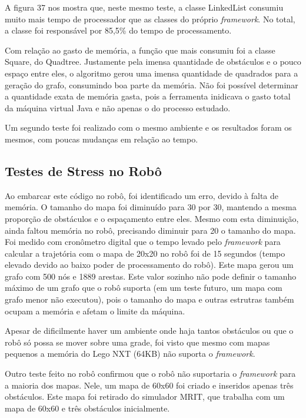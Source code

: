 A figura 37 nos mostra que, neste mesmo teste, a classe LinkedList consumiu muito mais tempo de processador que as classes do próprio \textit{framework}. No total, a classe foi responsável por 85,5\% do tempo de processamento.

Com relação ao gasto de memória, a função que mais consumiu foi a classe Square, do Quadtree. Justamente pela imensa quantidade de obstáculos e o pouco espaço entre eles, o algoritmo gerou uma imensa quantidade de quadrados para a geração do grafo, consumindo boa parte da memória. Não foi possível determinar a quantidade exata de memória gasta, pois a ferramenta inidicava o gasto total da máquina virtual Java e não apenas o do processo estudado.

Um segundo teste foi realizado com o mesmo ambiente e os resultados foram os mesmos, com poucas mudanças em relação ao tempo.

\subsection{Testes de Stress no Robô}

Ao embarcar este código no robô, foi identificado um erro, devido à falta de memória. O tamanho do mapa foi diminuído para 30 por 30, mantendo a mesma proporção de obstáculos e o espaçamento entre eles. Mesmo com esta diminuição, ainda faltou memória no robô, precisando diminuir para 20 o tamanho do mapa. Foi medido com cronômetro digital que o tempo levado pelo \textit{framework} para calcular a trajetória com o mapa de 20x20 no robô foi de 15 segundos (tempo elevado devido ao baixo poder de processamento do robô). Este mapa gerou um grafo com 500 nós e 1889 arestas. Este valor sozinho não pode definir o tamanho máximo de um grafo que o robô suporta (em um teste futuro, um mapa com grafo menor não executou), pois o tamanho do mapa e outras estrutras também ocupam a memória e afetam o limite da máquina.

Apesar de dificilmente haver um ambiente onde haja tantos obstáculos ou que o robô só possa se mover sobre uma grade, foi visto que mesmo com mapas pequenos a memória do Lego NXT (64KB) não suporta o \textit{framework}. 

Outro teste feito no robô confirmou que o robô não suportaria o \textit{framework} para a maioria dos mapas. Nele, um mapa de 60x60 foi criado e inseridos apenas três obstáculos. Este mapa foi retirado do simulador MRIT, que trabalha com um mapa de 60x60 e três obstáculos inicialmente. 

